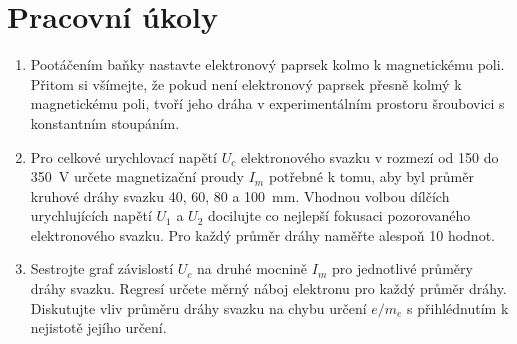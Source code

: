 \documentclass[a4paper]{article}
\author{Vladislav Wohlrath}
\begin{document}
\begin{titlepage}

\end{titlepage}

\section*{Pracovní úkoly}
\begin{enumerate}
\item Pootáčením baňky nastavte elektronový paprsek kolmo k magnetickému poli. Přitom si všímejte, že pokud není elektronový paprsek přesně kolmý k magnetickému poli, tvoří jeho dráha v experimentálním prostoru šroubovici s konstantním stoupáním.
\item Pro celkové urychlovací napětí $U_c$ elektronového svazku v rozmezí od 150 do \SI{350}{\volt} určete magnetizační proudy $I_m$ potřebné k tomu, aby byl průměr kruhové dráhy svazku 40, 60, 80 a \SI{100}{\mm}. Vhodnou volbou dílčích urychlujících napětí $U_1$ a $U_2$ docilujte co nejlepší fokusaci pozorovaného elektronového svazku. Pro každý průměr dráhy naměřte alespoň 10 hodnot.
\item Sestrojte graf závislostí $U_c$ na druhé mocnině $I_m$ pro jednotlivé průměry dráhy svazku. Regresí určete měrný náboj elektronu pro každý průměr dráhy. Diskutujte vliv průměru dráhy svazku na chybu určení $e/m_e$ s přihlédnutím k nejistotě jejího určení.


\end{enumerate}










\printbibliography[title={Seznam použité literatury}]
\end{document}
